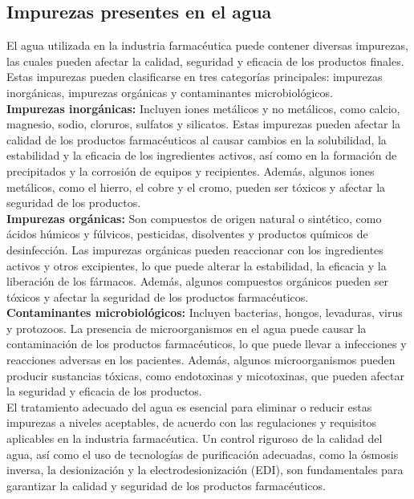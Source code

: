 \subsection{Impurezas presentes en el agua}

El agua utilizada en la industria farmacéutica puede contener diversas impurezas, las cuales pueden afectar la calidad, seguridad y eficacia de los productos finales. Estas impurezas pueden clasificarse en tres categorías principales: impurezas inorgánicas, impurezas orgánicas y contaminantes microbiológicos.\\

\textbf{Impurezas inorgánicas: }Incluyen iones metálicos y no metálicos, como calcio, magnesio, sodio, cloruros, sulfatos y silicatos. Estas impurezas pueden afectar la calidad de los productos farmacéuticos al causar cambios en la solubilidad, la estabilidad y la eficacia de los ingredientes activos, así como en la formación de precipitados y la corrosión de equipos y recipientes. Además, algunos iones metálicos, como el hierro, el cobre y el cromo, pueden ser tóxicos y afectar la seguridad de los productos.\\
\textbf{Impurezas orgánicas: }Son compuestos de origen natural o sintético, como ácidos húmicos y fúlvicos, pesticidas, disolventes y productos químicos de desinfección. Las impurezas orgánicas pueden reaccionar con los ingredientes activos y otros excipientes, lo que puede alterar la estabilidad, la eficacia y la liberación de los fármacos. Además, algunos compuestos orgánicos pueden ser tóxicos y afectar la seguridad de los productos farmacéuticos.\\
\textbf{Contaminantes microbiológicos:} Incluyen bacterias, hongos, levaduras, virus y protozoos. La presencia de microorganismos en el agua puede causar la contaminación de los productos farmacéuticos, lo que puede llevar a infecciones y reacciones adversas en los pacientes. Además, algunos microorganismos pueden producir sustancias tóxicas, como endotoxinas y micotoxinas, que pueden afectar la seguridad y eficacia de los productos.\\

El tratamiento adecuado del agua es esencial para eliminar o reducir estas impurezas a niveles aceptables, de acuerdo con las regulaciones y requisitos aplicables en la industria farmacéutica. Un control riguroso de la calidad del agua, así como el uso de tecnologías de purificación adecuadas, como la ósmosis inversa, la desionización y la electrodesionización (EDI), son fundamentales para garantizar la calidad y seguridad de los productos farmacéuticos.\\
